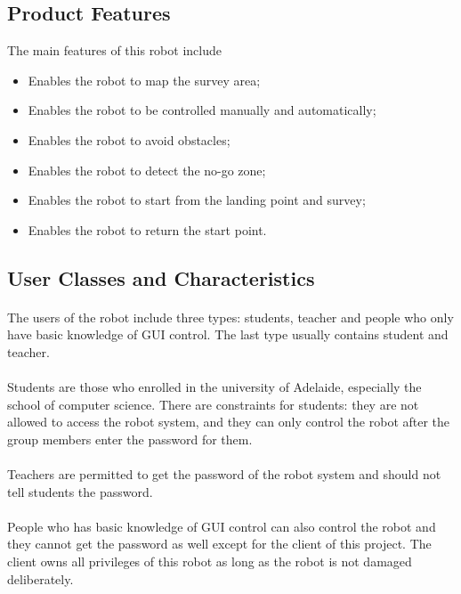 \documentclass[10pt,a4paper,titlepage]{article}
\begin{document}
\subsection{Product Features}
The main features of this robot include
\begin{itemize}
	\item Enables the robot to map the survey area;
	\item Enables the robot to be controlled manually and automatically;
	\item Enables the robot to avoid obstacles;
	\item Enables the robot to detect the no-go zone;
	\item Enables the robot to start from the landing point and survey;
	\item Enables the robot to return the start point.
\end{itemize}

\subsection{User Classes and Characteristics}
\paragraph{}
The users of the robot include three types: students, teacher and people who only have basic knowledge of GUI control. The last type usually contains student and teacher.
\paragraph{}
Students are those who enrolled in the university of Adelaide, especially the school of computer science. There are constraints for students: they are not allowed to access the robot system, and they can only control the robot after the group members enter the password for them.
\paragraph{}
Teachers are permitted to get the password of the robot system and should not tell students the password. 
\paragraph{}
People who has basic knowledge of GUI control can also control the robot and they cannot get the password as well except for the client of this project. The client owns all privileges of this robot as long as the robot is not damaged deliberately.
\end{document}
